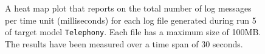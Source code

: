 \begin{figure}[htbp]
\centering
\begin{minipage}{1\textwidth}
  \centering
\end{minipage}
\caption{A heat map plot that reports on the total number of log messages per time unit (milliseconds) for each log file generated during run 5 of target model \texttt{Telephony}. Each file has a maximum size of 100MB. The results have been measured over a time span of 30 seconds.}
\label{figure:throughput_sum_random_det_telephony_5}
\end{figure}